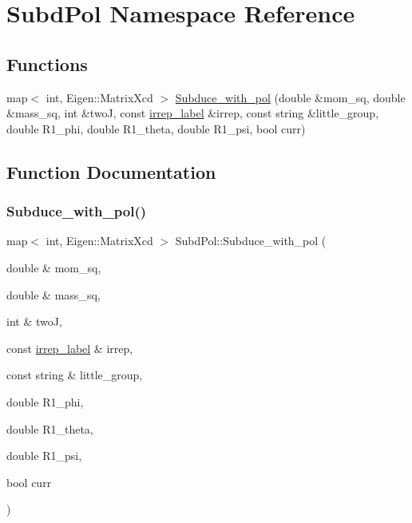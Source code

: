 \hypertarget{namespaceSubdPol}{}\section{Subd\+Pol Namespace Reference}
\label{namespaceSubdPol}
\subsection*{Functions}
\begin{DoxyCompactItemize}
\item 
map$<$ int, Eigen\+::\+Matrix\+Xcd $>$ \mbox{\hyperlink{namespaceSubdPol_a0c27e6a0353d158613d8d77e3c0ebbe7}{Subduce\+\_\+with\+\_\+pol}} (double \&mom\+\_\+sq, double \&mass\+\_\+sq, int \&twoJ, const \mbox{\hyperlink{structirrep__label}{irrep\+\_\+label}} \&irrep, const string \&little\+\_\+group, double R1\+\_\+phi, double R1\+\_\+theta, double R1\+\_\+psi, bool curr)
\end{DoxyCompactItemize}


\subsection{Function Documentation}
\mbox{\label{namespaceSubdPol_a0c27e6a0353d158613d8d77e3c0ebbe7}} 
\subsubsection{\texorpdfstring{Subduce\_with\_pol()}{Subduce\_with\_pol()}}
{\footnotesize\ttfamily map$<$ int, Eigen\+::\+Matrix\+Xcd $>$ Subd\+Pol\+::\+Subduce\+\_\+with\+\_\+pol (\begin{DoxyParamCaption}\item[{double \&}]{mom\+\_\+sq,  }\item[{double \&}]{mass\+\_\+sq,  }\item[{int \&}]{twoJ,  }\item[{const \mbox{\hyperlink{structirrep__label}{irrep\+\_\+label}} \&}]{irrep,  }\item[{const string \&}]{little\+\_\+group,  }\item[{double}]{R1\+\_\+phi,  }\item[{double}]{R1\+\_\+theta,  }\item[{double}]{R1\+\_\+psi,  }\item[{bool}]{curr }\end{DoxyParamCaption})}

